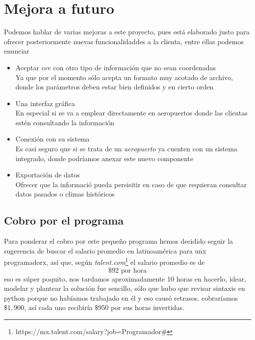 \documentclass[letterpaper]{article}
\begin{document}
\section{Mejora a futuro}
Podemos hablar de varias mejoras a este proyecto, pues está elaborado justo para ofrecer posteriormente nuevas funcionalidaddes a la clienta, entre ellas podemos enunciar
\begin{itemize}
	\item Aceptar csv con otro tipo de información que no sean coordenadas\\
	Ya que por el momento sólo acepta un formato muy acotado de archivo, donde los parámetros deben estar bien definidos y en cierto orden
	\item Una interfaz gráfica \\
	En especial si se va a emplear directamente en aeropuertos donde las clientas estén consultando la información
	\item Conexión con su sistema\\
	Es casi seguro que si se trata de un \textit{aeropuerto} ya cuenten con un sistema integrado, donde podríamos anexar este nuevo componente
	\item Exportación de datos\\
	Ofrecer que la informació pueda persisitir en caso de que requieran consultar datos pasados o climas históricos
\end{itemize}
\subsection{Cobro por el programa}
Para ponderar el cobro por este pequeño programa hemos decidido seguir la sugerencia de buscar el salario promedio en latinoamérica para unx programadorx, así que, según \textit{talent.com}\footnote{https://mx.talent.com/salary?job=Programador\#} el salario promedio es de 
\[  \$ 92 \text{  por hora} \] 
eso es súper poquito, nos tardamos aproximadamente 10 horas en hacerlo, idear, modelar y plantear la solución fue sencillo, sólo que hubo que revisar sintaxis en python porque no habíamos trabajado en él y eso causó retrasos.
cobraríamos $ \$1,900 $, así cada uno recibiría $ \$ 950 $ por sus horas invertidas.
\end{document}
